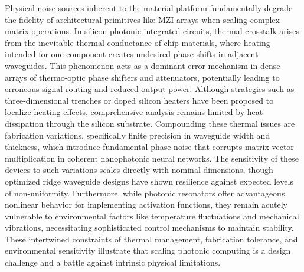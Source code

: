 Physical noise sources inherent to the material platform fundamentally degrade the fidelity of architectural primitives like MZI arrays when scaling complex matrix operations. In silicon photonic integrated circuits, thermal crosstalk arises from the inevitable thermal conductance of chip materials, where heating intended for one component creates undesired phase shifts in adjacent waveguides. \citep{doi_10_1109_access_2020_3013116_8fec1fb2} This phenomenon acts as a dominant error mechanism in dense arrays of thermo-optic phase shifters and attenuators, potentially leading to erroneous signal routing and reduced output power. Although strategies such as three-dimensional trenches or doped silicon heaters have been proposed to localize heating effects, comprehensive analysis remains limited by heat dissipation through the silicon substrate. Compounding these thermal issues are fabrication variations, specifically finite precision in waveguide width and thickness, which introduce fundamental phase noise that corrupts matrix-vector multiplication in coherent nanophotonic neural networks. \citep{doi_10_1109_tnano_2022_3223915_d4da3e6b} The sensitivity of these devices to such variations scales directly with nominal dimensions, though optimized ridge waveguide designs have shown resilience against expected levels of non-uniformity. Furthermore, while photonic resonators offer advantageous nonlinear behavior for implementing activation functions, they remain acutely vulnerable to environmental factors like temperature fluctuations and mechanical vibrations, necessitating sophisticated control mechanisms to maintain stability. These intertwined constraints of thermal management, fabrication tolerance, and environmental sensitivity illustrate that scaling photonic computing is a design challenge and a battle against intrinsic physical limitations. \citep{doi_10_1109_access_2020_3013116_8fec1fb2} \citep{doi_10_1109_tnano_2022_3223915_d4da3e6b} \citep{doi_10_3390_nano14080697_c372a140}

